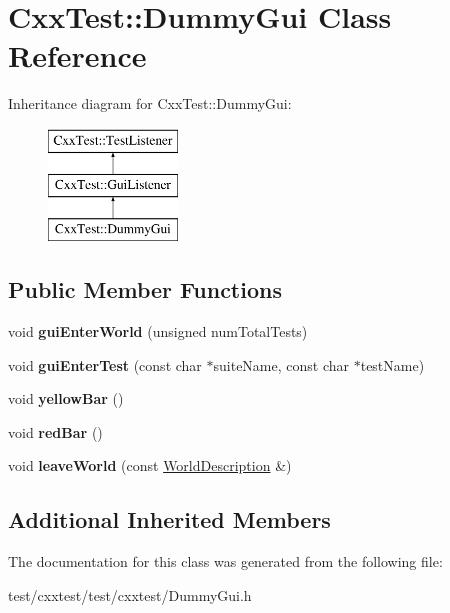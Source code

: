 \hypertarget{classCxxTest_1_1DummyGui}{\section{Cxx\-Test\-:\-:Dummy\-Gui Class Reference}
\label{classCxxTest_1_1DummyGui}
}
Inheritance diagram for Cxx\-Test\-:\-:Dummy\-Gui\-:\begin{figure}[H]
\begin{center}
\leavevmode
\includegraphics[height=3.000000cm]{classCxxTest_1_1DummyGui}
\end{center}
\end{figure}
\subsection*{Public Member Functions}
\begin{DoxyCompactItemize}
\item 
\hypertarget{classCxxTest_1_1DummyGui_a15b0222f2faf7b291164fd2520c02a87}{void {\bfseries gui\-Enter\-World} (unsigned num\-Total\-Tests)}\label{classCxxTest_1_1DummyGui_a15b0222f2faf7b291164fd2520c02a87}

\item 
\hypertarget{classCxxTest_1_1DummyGui_af62bf6f68c3f8d7d14c02e0ab479b0d1}{void {\bfseries gui\-Enter\-Test} (const char $\ast$suite\-Name, const char $\ast$test\-Name)}\label{classCxxTest_1_1DummyGui_af62bf6f68c3f8d7d14c02e0ab479b0d1}

\item 
\hypertarget{classCxxTest_1_1DummyGui_aeae4ca8fafa4adb65059a89bb325a6a5}{void {\bfseries yellow\-Bar} ()}\label{classCxxTest_1_1DummyGui_aeae4ca8fafa4adb65059a89bb325a6a5}

\item 
\hypertarget{classCxxTest_1_1DummyGui_ac07820db73af309742c128c9d40d75ab}{void {\bfseries red\-Bar} ()}\label{classCxxTest_1_1DummyGui_ac07820db73af309742c128c9d40d75ab}

\item 
\hypertarget{classCxxTest_1_1DummyGui_ad91d806815c7e4ee195c7003ee552464}{void {\bfseries leave\-World} (const \hyperlink{classCxxTest_1_1WorldDescription}{World\-Description} \&)}\label{classCxxTest_1_1DummyGui_ad91d806815c7e4ee195c7003ee552464}

\end{DoxyCompactItemize}
\subsection*{Additional Inherited Members}


The documentation for this class was generated from the following file\-:\begin{DoxyCompactItemize}
\item 
test/cxxtest/test/cxxtest/Dummy\-Gui.\-h\end{DoxyCompactItemize}
